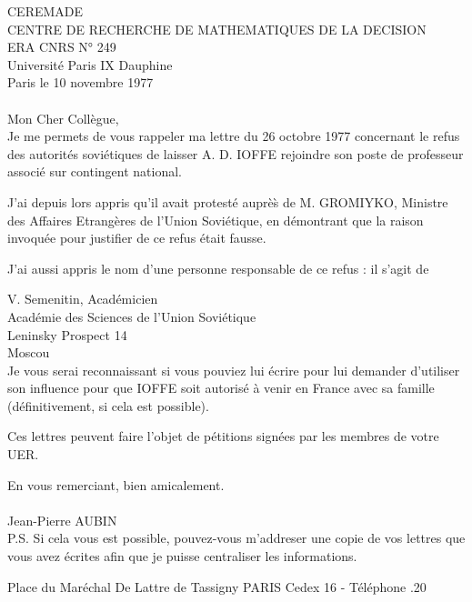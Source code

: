 CEREMADE\\
CENTRE DE RECHERCHE DE MATHEMATIQUES DE LA DECISION\\
ERA \quad CNRS \quad N° 249\\
Université Paris IX Dauphine\\
Paris\unsure{\textasciidieresis|\textquotedbl} le 10 novembre 1977\\
\\

Mon Cher Collègue,\\

Je me permets de vous rappeler ma lettre du 26 octobre 1977 concernant le refus des autorités soviétiques de laisser A. D. IOFFE rejoindre son poste de professeur associé sur contingent national.

J'ai depuis lors appris qu'il avait protesté auprè\`{s} de M. GROMIYKO, Ministre des Affaires Etrangères de l'Union Soviétique, en démontrant que la raison invoquée pour justifier de ce refus était fausse.

J'ai aussi appris le nom d'une personne responsable de ce refus : il s'agit de

V. Semenitin, Académicien\\
Académie des Sciences de l'Union Soviétique\\
Leninsky Prospect 14\\
Moscou\\

Je vous serai reconnaissant si vous pouviez lui écrire pour lui demander d'utiliser son influence pour que IOFFE soit autorisé à venir en France avec sa famille (définitivement, si cela est possible).

Ces lettres peuvent faire l'objet de pétitions signées par les membres de votre UER.

En vous remerciant, bien amicalement.\\
\\
Jean-Pierre AUBIN\\

P.S. Si cela vous est possible, pouvez-vous m'addreser une copie de vos lettres que vous avez écrites afin que je puisse centraliser les informations.

Place du Maréchal De Lattre de Tassigny  PARIS Cedex 16 - Téléphone .20
